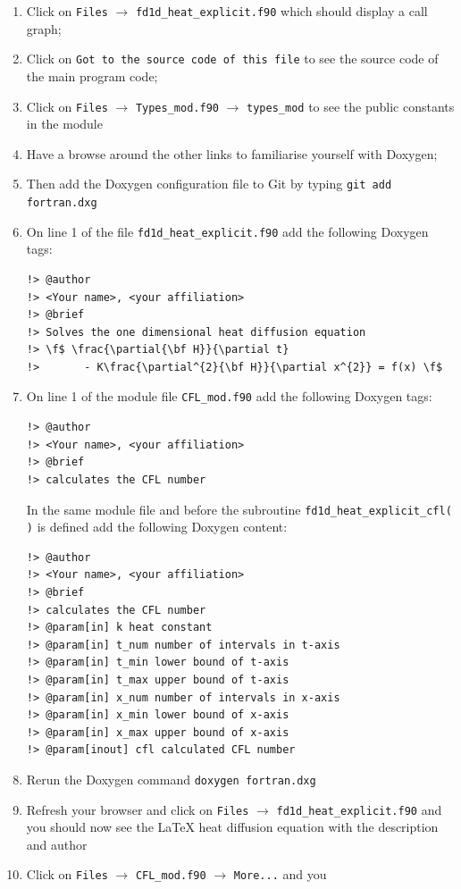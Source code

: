 \documentclass[12pt]{article}
\begin{document}
\begin{enumerate}
\begin{enumerate}
\item Click on \texttt{Files} $\rightarrow$ \texttt{fd1d\_heat\_explicit.f90} which should display a call graph;
\item Click on \texttt{Got to the source code of this file} to see the source code of the main program code;
\item Click on \texttt{Files} $\rightarrow$ \texttt{Types\_mod.f90} $\rightarrow$ \texttt{types\_mod} to see
the public constants in the module
\item Have a browse around the other links to familiarise yourself with Doxygen;
\item Then add the Doxygen configuration file to Git by typing \texttt{git add fortran.dxg}
\item On line 1 of the file \texttt{fd1d\_heat\_explicit.f90} add the following Doxygen tags:
\begin{verbatim}
!> @author
!> <Your name>, <your affiliation>
!> @brief 
!> Solves the one dimensional heat diffusion equation
!> \f$ \frac{\partial{\bf H}}{\partial t} 
!>       - K\frac{\partial^{2}{\bf H}}{\partial x^{2}} = f(x) \f$
\end{verbatim}
\item On line 1 of the module file \texttt{CFL\_mod.f90} add the following Doxygen tags:
\begin{verbatim}
!> @author
!> <Your name>, <your affiliation>
!> @brief
!> calculates the CFL number
\end{verbatim}
In the same module file and before the subroutine \texttt{fd1d\_heat\_explicit\_cfl( )} is defined add
the following Doxygen content:
\begin{verbatim}
!> @author
!> <Your name>, <your affiliation>
!> @brief
!> calculates the CFL number
!> @param[in] k heat constant
!> @param[in] t_num number of intervals in t-axis
!> @param[in] t_min lower bound of t-axis
!> @param[in] t_max upper bound of t-axis
!> @param[in] x_num number of intervals in x-axis
!> @param[in] x_min lower bound of x-axis
!> @param[in] x_max upper bound of x-axis
!> @param[inout] cfl calculated CFL number
\end{verbatim}
\item Rerun the Doxygen command \texttt{doxygen fortran.dxg}
\item Refresh your browser and click on \texttt{Files} $\rightarrow$ \texttt{fd1d\_heat\_explicit.f90} and you
should now see the LaTeX heat diffusion equation with the description and author
\item Click on \texttt{Files} $\rightarrow$ \texttt{CFL\_mod.f90} $\rightarrow$ \texttt{More...} and you 

\end{enumerate}
\end{enumerate}
\end{document}
